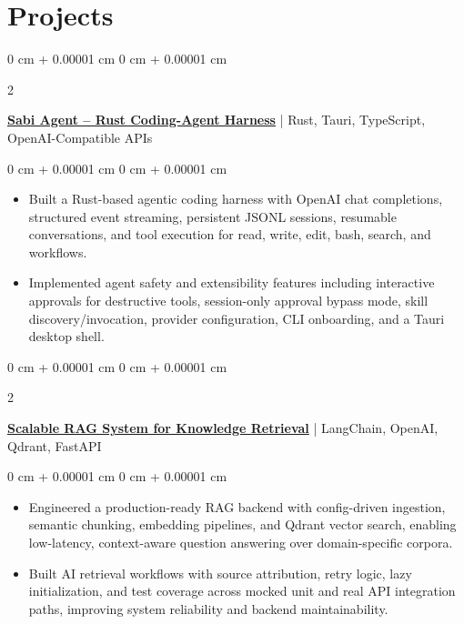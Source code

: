 \documentclass[10pt, letterpaper]{article}
\newenvironment{highlights}{
    \begin{itemize}[
        topsep=0.10 cm,
        parsep=0.10 cm,
        partopsep=0pt,
        itemsep=0pt,
        leftmargin=0 cm + 10pt
    ]
}{
    \end{itemize}
} %
\newenvironment{onecolentry}{
    \begin{adjustwidth}{
        0 cm + 0.00001 cm
    }{
        0 cm + 0.00001 cm
    }
}{
    \end{adjustwidth}
} %
\newenvironment{twocolentry}[2][]{
    \onecolentry
    \def\secondColumn{#2}
    \setcolumnwidth{\fill, 4.5 cm}
    \begin{paracol}{2}
}{
    \switchcolumn \raggedleft \secondColumn
    \end{paracol}
    \endonecolentry
} %
\renewenvironment{highlights}{
    \begin{itemize}[
        topsep=0.05cm,
        parsep=0.10cm,
        partopsep=1pt,
        itemsep=0pt,
        leftmargin=0cm + 10pt
    ]
}{
    \end{itemize}
}
\begin{document}
\section{Projects}


\begin{twocolentry}{2026}
\textbf{\href{https://github.com/notquite28/sabi-agent}{Sabi Agent -- Rust Coding-Agent Harness}} | Rust, Tauri, TypeScript, OpenAI-Compatible APIs
\end{twocolentry}
\vspace{0.05cm}
\begin{onecolentry}
\begin{highlights}
\item Built a Rust-based agentic coding harness with OpenAI chat completions, structured event streaming, persistent JSONL sessions, resumable conversations, and tool execution for read, write, edit, bash, search, and workflows.
\item Implemented agent safety and extensibility features including interactive approvals for destructive tools, session-only approval bypass mode, skill discovery/invocation, provider configuration, CLI onboarding, and a Tauri desktop shell.
\end{highlights}
\end{onecolentry}
\vspace{0.3cm}


\begin{twocolentry}{2026}
\textbf{\href{https://github.com/notquite28/langchain-rag}{Scalable RAG System for Knowledge Retrieval}} | LangChain, OpenAI, Qdrant, FastAPI
\end{twocolentry}
\vspace{0.05cm}
\begin{onecolentry}
\begin{highlights}
    \item Engineered a production-ready RAG backend with config-driven ingestion, semantic chunking, embedding pipelines, and Qdrant vector search, enabling low-latency, context-aware question answering over domain-specific corpora.
    \item Built AI retrieval workflows with source attribution, retry logic, lazy initialization, and test coverage across mocked unit and real API integration paths, improving system reliability and backend maintainability.
\end{highlights}
\end{onecolentry}

\vspace{0.3cm}
\end{document}
